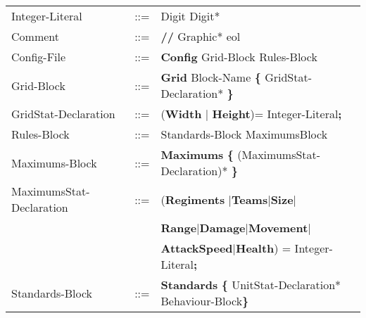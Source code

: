 \begin{center}
\begin{longtable}{ l l l }
		Integer-Literal				&	::=	&Digit Digit*\\
		Comment						&	::=	&{\bf //} Graphic* eol\\
		Config-File					&	::=	&{\bf Config} Grid-Block Rules-Block  		\\
		Grid-Block					&	::=	&{\bf Grid} Block-Name	 {\bf \{} GridStat-Declaration* \bf{\}} \\
		GridStat-Declaration		&	::=	&({\bf Width} $\mid$ {\bf Height})=  Integer-Literal{\bf ;} \\	
		Rules-Block					&	::=	&Standards-Block MaximumsBlock 				\\
		Maximums-Block				&	::=	&{\bf Maximums} {\bf \{} (MaximumsStat-Declaration)* {\bf \}}\\
		MaximumsStat-Declaration	&	::=	&({\bf Regiments }$\mid${\bf Teams}$\mid${\bf Size}$\mid$\\
									&		&{\bf Range}$\mid${\bf Damage}$\mid${\bf Movement}$\mid$\\
									&		&{\bf AttackSpeed}$\mid${\bf Health}) =  Integer-Literal{\bf ;}\\
		Standards-Block				&	::=	&{\bf Standards} {\bf \{ } UnitStat-Declaration* Behaviour-Block\bf{\} }		\\
			\end{longtable}
		\end{center}					     

